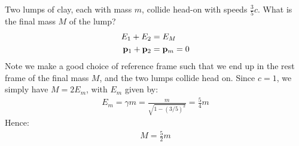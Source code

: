 \begin{example}
  Two lumps of clay, each with mass $m$, collide head-on with speeds $\frac35c$. What is the final mass $M$ of the lump?
  \begin{align*}
    E_1+E_2&=E_M\\
    \vb{p}_1+\vb{p}_2&=\vb{p}_m=0
  \end{align*}
  Note we make a good choice of reference frame such that we end up in the rest frame of the final mass $M$, and the two lumps collide head on. Since $c=1$, we simply have $M=2E_m$, with $E_m$ given by:
  \begin{align*}
    E_m=\gamma m=\frac{m}{\sqrt{1-(3/5)^2}}=\frac54m
  \end{align*}
  Hence:
  \begin{align*}
    \boxed{M=\frac52m}
  \end{align*}
\end{example}
